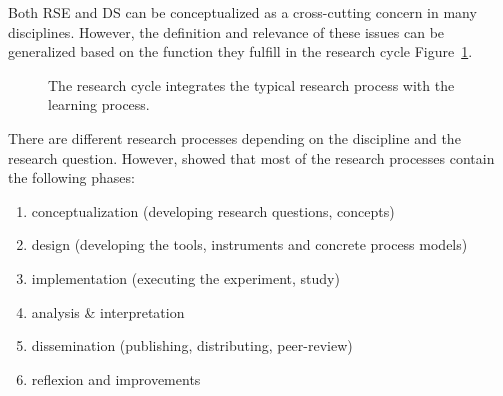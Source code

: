 \documentclass[
        english,biblatex
    ]{lni}
\providecommand{\tightlist}{%
    \setlength{\itemsep}{0pt}\setlength{\parskip}{0pt}}
\begin{document}
    Both RSE and DS can be conceptualized as a cross-cutting concern in
    many disciplines. However, the definition and relevance of these
    issues can be generalized based on the function they fulfill in the
    research cycle Figure~\ref{fig-research_cycle}.

    \begin{figure}


    \caption{\label{fig-research_cycle}The research cycle
    \autocite{wildt2009forschendes} integrates the typical research
    process with the learning process.}

    \end{figure}%

    There are different research processes depending on the discipline
    and the research question. However, \autocite{Dehne2021} showed that
    most of the research processes contain the following phases:

    \begin{enumerate}
    \def\labelenumi{\arabic{enumi}.}
    \tightlist
    \item
      conceptualization (developing research questions, concepts)
    \item
      design (developing the tools, instruments and concrete process
      models)
    \item
      implementation (executing the experiment, study)
    \item
      analysis \& interpretation
    \item
      dissemination (publishing, distributing, peer-review)
    \item
      reflexion and improvements
    \end{enumerate}
\end{document}
